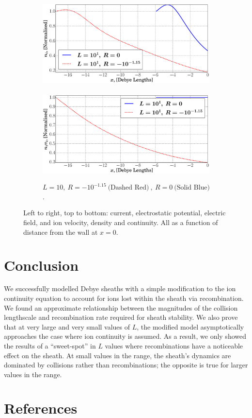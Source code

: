 \documentclass[aip,apl,reprint]{revtex4-1}
\begin{document}
\begin{figure}
\begin{subfigure}[c]{\linewidth}
			\includegraphics[width=0.44\linewidth]{4_1l.eps}
			~
			\includegraphics[width=0.44\linewidth]{6_1l.eps}
			\vspace{-0.3cm}
			\caption{$ L = 10,~ R = -10^{-1.15}~\textrm{(Dashed Red)}~,~ R = 0~\textrm{(Solid Blue)} $.}
			\label{sf:rsltb}
		\end{subfigure}
		\vspace{-0.3cm}
		\caption{Left to right, top to bottom: current, electrostatic potential, electric field, and ion velocity, density and continuity. All as a function of distance from the wall at $x=0$.}
		\label{f:rslt}
	\end{figure}
	\clearpage
	\section{Conclusion}
	We successfully modelled Debye sheaths with a simple modification to the ion continuity equation to account for ions lost within the sheath via recombination. We found an approximate relationship between the magnitudes of the collision lengthscale and recombination rate required for sheath stability. We also prove that at very large and very small values of $L$, the modified model asymptotically approaches the case where ion continuity is assumed. As a result, we only showed the results of a ``sweet-spot'' in $L$ values where recombinations have a noticeable effect on the sheath. At small values in the range, the sheath's dynamics are dominated by collisions rather than recombinations; the opposite is true for larger values in the range.
	\section{References}
	

	
\end{document}
